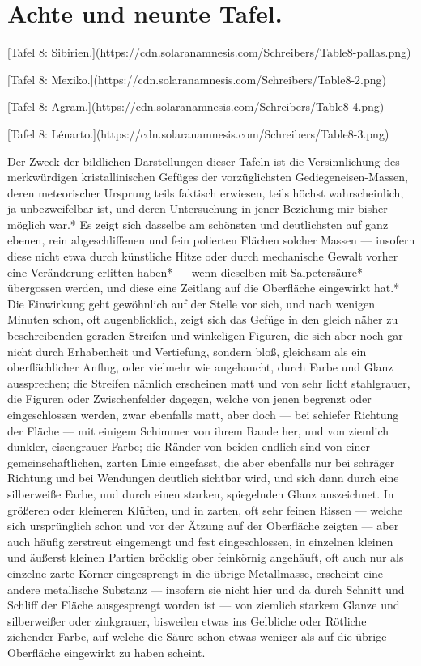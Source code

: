 \documentclass[a4paper, 11pt, oneside, german]{article}
\begin{document}
\section{Achte und neunte Tafel.}

[Tafel 8: Sibirien.](https://cdn.solaranamnesis.com/Schreibers/Table8-pallas.png)

[Tafel 8: Mexiko.](https://cdn.solaranamnesis.com/Schreibers/Table8-2.png)

[Tafel 8: Agram.](https://cdn.solaranamnesis.com/Schreibers/Table8-4.png)

[Tafel 8: Lénarto.](https://cdn.solaranamnesis.com/Schreibers/Table8-3.png)

Der Zweck der bildlichen Darstellungen dieser Tafeln ist die Versinnlichung des merkwürdigen kristallinischen Gefüges der vorzüglichsten Gediegeneisen-Massen, deren meteorischer Ursprung teils faktisch erwiesen, teils höchst wahrscheinlich, ja unbezweifelbar ist, und deren Untersuchung in jener Beziehung mir bisher möglich war.* Es zeigt sich dasselbe am schönsten und deutlichsten auf ganz ebenen, rein abgeschliffenen und fein polierten Flächen solcher Massen --- insofern diese nicht etwa durch künstliche Hitze oder durch mechanische Gewalt vorher eine Veränderung erlitten haben* --- wenn dieselben mit Salpetersäure* übergossen werden, und diese eine Zeitlang auf die Oberfläche eingewirkt hat.* Die Einwirkung geht gewöhnlich auf der Stelle vor sich, und nach wenigen Minuten schon, oft augenblicklich, zeigt sich das Gefüge in den gleich näher zu beschreibenden geraden Streifen und winkeligen Figuren, die sich aber noch gar nicht durch Erhabenheit und Vertiefung, sondern bloß, gleichsam als ein oberflächlicher Anflug, oder vielmehr wie angehaucht, durch Farbe und Glanz aussprechen; die Streifen nämlich erscheinen matt und von sehr licht stahlgrauer, die Figuren oder Zwischenfelder dagegen, welche von jenen begrenzt oder eingeschlossen werden, zwar ebenfalls matt, aber doch --- bei schiefer Richtung der Fläche --- mit einigem Schimmer von ihrem Rande her, und von ziemlich dunkler, eisengrauer Farbe; die Ränder von beiden endlich sind von einer gemeinschaftlichen, zarten Linie eingefasst, die aber ebenfalls nur bei schräger Richtung und bei Wendungen deutlich sichtbar wird, und sich dann durch eine silberweiße Farbe, und durch einen starken, spiegelnden Glanz auszeichnet. In größeren oder kleineren Klüften, und in zarten, oft sehr feinen Rissen --- welche sich ursprünglich schon und vor der Ätzung auf der Oberfläche zeigten --- aber auch häufig zerstreut eingemengt und fest eingeschlossen, in einzelnen kleinen und äußerst kleinen Partien bröcklig ober feinkörnig angehäuft, oft auch nur als einzelne zarte Körner eingesprengt in die übrige Metallmasse, erscheint eine andere metallische Substanz --- insofern sie nicht hier und da durch Schnitt und Schliff der Fläche ausgesprengt worden ist --- von ziemlich starkem Glanze und silberweißer oder zinkgrauer, bisweilen etwas ins Gelbliche oder Rötliche ziehender Farbe, auf welche die Säure schon etwas weniger als auf die übrige Oberfläche eingewirkt zu haben scheint.
\end{document}
